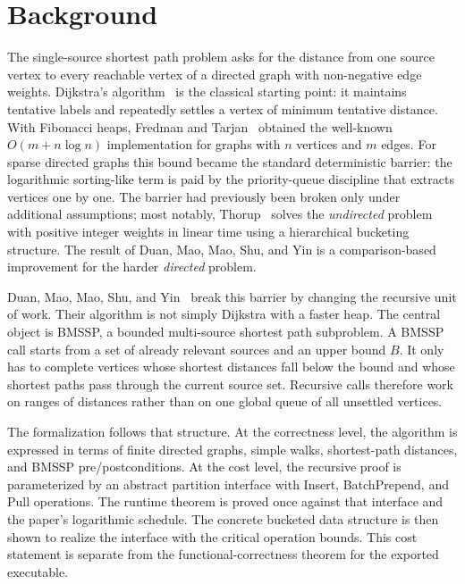 \documentclass[11pt,a4paper]{article}
\begin{document}
\tableofcontents

\section{Background}

The single-source shortest path problem asks for the distance from one source
vertex to every reachable vertex of a directed graph with non-negative edge
weights.  Dijkstra's algorithm~\cite{Dijkstra1959} is the classical starting
point: it maintains tentative labels and repeatedly settles a vertex of
minimum tentative distance.  With Fibonacci heaps, Fredman and
Tarjan~\cite{FredmanTarjan1987} obtained the well-known
\(O(m+n\log n)\) implementation for graphs with \(n\) vertices and \(m\)
edges.  For sparse directed graphs this bound became the standard deterministic
barrier: the logarithmic sorting-like term is paid by the priority-queue
discipline that extracts vertices one by one.  The barrier had previously been
broken only under additional assumptions; most notably,
Thorup~\cite{Thorup1999} solves the \emph{undirected} problem with positive
integer weights in linear time using a hierarchical bucketing structure.  The
result of Duan, Mao, Mao, Shu, and Yin is a comparison-based improvement for
the harder \emph{directed} problem.

Duan, Mao, Mao, Shu, and Yin~\cite{DuanMaoMaoShuYin2025} break this barrier
by changing the recursive unit of work.  Their algorithm is not simply
Dijkstra with a faster heap.  The central object is BMSSP, a bounded
multi-source shortest path subproblem.  A BMSSP call starts from a set of
already relevant sources and an upper bound \(B\).  It only has to complete
vertices whose shortest distances fall below the bound and whose shortest
paths pass through the current source set.  Recursive calls therefore work on
ranges of distances rather than on one global queue of all unsettled vertices.

The formalization follows that structure.  At the correctness level, the
algorithm is expressed in terms of finite directed graphs, simple walks,
shortest-path distances, and BMSSP pre/postconditions.  At the cost level, the
recursive proof is parameterized by an abstract partition interface with
Insert, BatchPrepend, and Pull operations.  The runtime theorem is proved once
against that interface and the paper's logarithmic schedule.  The concrete
bucketed data structure is then shown to realize the interface with the
critical operation bounds.  This cost statement is separate from the
functional-correctness theorem for the exported executable.
\end{document}
